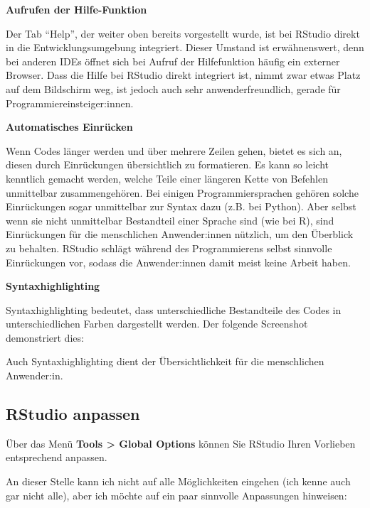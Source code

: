\documentclass[
]{book}
\begin{document}
\textbf{Aufrufen der Hilfe-Funktion}

Der Tab ``Help'', der weiter oben bereits vorgestellt wurde, ist bei RStudio direkt in die Entwicklungsumgebung integriert.
Dieser Umstand ist erwähnenswert, denn bei anderen IDEs öffnet sich bei Aufruf der Hilfefunktion häufig ein externer Browser.
Dass die Hilfe bei RStudio direkt integriert ist, nimmt zwar etwas Platz auf dem Bildschirm weg, ist jedoch auch sehr anwenderfreundlich, gerade für Programmiereinsteiger:innen.

\textbf{Automatisches Einrücken}

Wenn Codes länger werden und über mehrere Zeilen gehen, bietet es sich an, diesen durch Einrückungen übersichtlich zu formatieren. Es kann so leicht kenntlich gemacht werden, welche Teile einer längeren Kette von Befehlen unmittelbar zusammengehören.
Bei einigen Programmiersprachen gehören solche Einrückungen sogar unmittelbar zur Syntax dazu (z.B. bei Python). Aber selbst wenn sie nicht unmittelbar Bestandteil einer Sprache sind (wie bei R), sind Einrückungen für die menschlichen Anwender:innen nützlich, um den Überblick zu behalten.
RStudio schlägt während des Programmierens selbst sinnvolle Einrückungen vor, sodass die Anwender:innen damit meist keine Arbeit haben.

\textbf{Syntaxhighlighting}

Syntaxhighlighting bedeutet, dass unterschiedliche Bestandteile des Codes in unterschiedlichen Farben dargestellt werden. Der folgende Screenshot demonstriert dies:

Auch Syntaxhighlighting dient der Übersichtlichkeit für die menschlichen Anwender:in.

\hypertarget{rstudio-anpassen}{%
\subsection{RStudio anpassen}\label{rstudio-anpassen}}

Über das Menü \textbf{Tools \textgreater{} Global Options} können Sie RStudio Ihren Vorlieben entsprechend anpassen.

An dieser Stelle kann ich nicht auf alle Möglichkeiten eingehen (ich kenne auch gar nicht alle), aber ich möchte auf ein paar sinnvolle Anpassungen hinweisen:
\end{document}
